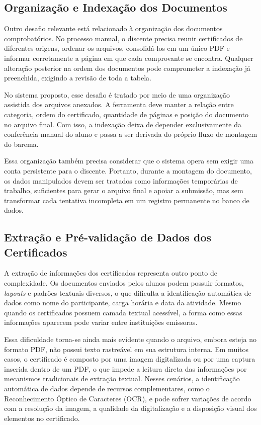 \subsection{Organização e Indexação dos Documentos} \label{subsec:manipulacao_arquivos}

Outro desafio relevante está relacionado à organização dos documentos comprobatórios. No processo manual, o discente precisa reunir certificados de diferentes origens, ordenar os arquivos, consolidá-los em um único PDF e informar corretamente a página em que cada comprovante se encontra. Qualquer alteração posterior na ordem dos documentos pode comprometer a indexação já preenchida, exigindo a revisão de toda a tabela.

No sistema proposto, esse desafio é tratado por meio de uma organização assistida dos arquivos anexados. A ferramenta deve manter a relação entre categoria, ordem do certificado, quantidade de páginas e posição do documento no arquivo final. Com isso, a indexação deixa de depender exclusivamente da conferência manual do aluno e passa a ser derivada do próprio fluxo de montagem do barema.

Essa organização também precisa considerar que o sistema opera sem exigir uma conta persistente para o discente. Portanto, durante a montagem do documento, os dados manipulados devem ser tratados como informações temporárias de trabalho, suficientes para gerar o arquivo final e apoiar a submissão, mas sem transformar cada tentativa incompleta em um registro permanente no banco de dados.

\subsection{Extração e Pré-validação de Dados dos Certificados}

A extração de informações dos certificados representa outro ponto de complexidade. Os documentos enviados pelos alunos podem possuir formatos, \textit{layouts} e padrões textuais diversos, o que dificulta a identificação automática de dados como nome do participante, carga horária e data da atividade. Mesmo quando os certificados possuem camada textual acessível, a forma como essas informações aparecem pode variar entre instituições emissoras.

Essa dificuldade torna-se ainda mais evidente quando o arquivo, embora esteja no formato PDF, não possui texto rastreável em sua estrutura interna. Em muitos casos, o certificado é composto por uma imagem digitalizada ou por uma captura inserida dentro de um PDF, o que impede a leitura direta das informações por mecanismos tradicionais de extração textual. Nesses cenários, a identificação automática de dados depende de recursos complementares, como o Reconhecimento Óptico de Caracteres (OCR), e pode sofrer variações de acordo com a resolução da imagem, a qualidade da digitalização e a disposição visual dos elementos no certificado.

